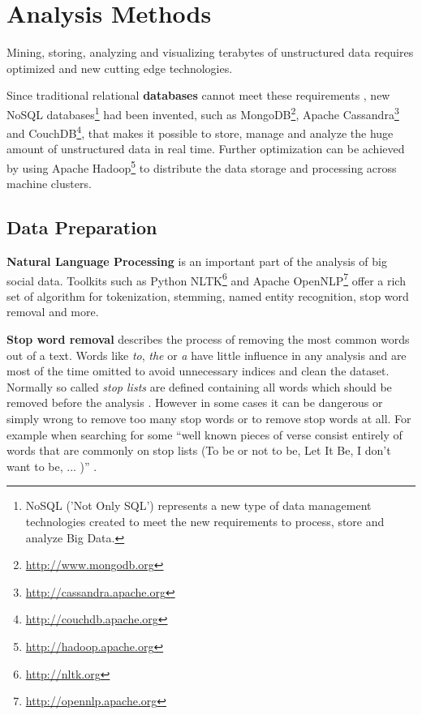\section{Analysis Methods}
\label{sec:technologies}
Mining, storing, analyzing and visualizing terabytes of unstructured data requires optimized and new cutting edge technologies. 

Since traditional relational \textbf{databases} cannot meet these requirements \cite{TwitterDataAnalytics2013}, new NoSQL databases\footnote{NoSQL ('Not Only SQL') represents a new type of data management technologies created to meet the new requirements to process, store and analyze Big Data.} had been invented, such as MongoDB\footnote{\url{http://www.mongodb.org} \accessednote }, Apache Cassandra\footnote{\url{http://cassandra.apache.org} \accessednote} and CouchDB\footnote{\url{http://couchdb.apache.org} \accessednote}, that makes it possible to store, manage and analyze the huge amount of unstructured data in real time. Further optimization can be achieved by using Apache Hadoop\footnote{\url{http://hadoop.apache.org} \accessednote} to distribute the data storage and processing across machine clusters.


\subsection{Data Preparation}
\label{subsec:data-preparation}
\textbf{Natural Language Processing} is an important part of the analysis of big social data. Toolkits such as Python NLTK\footnote{\url{http://nltk.org} \accessednote} and Apache OpenNLP\footnote{\url{http://opennlp.apache.org} \accessednote} offer a rich set of algorithm for tokenization, stemming, named entity recognition, stop word removal and more.

\textbf{Stop word removal} describes the process of removing the most common words out of a text. Words like \textit{to}, \textit{the} or \textit{a} have little influence in any analysis and are most of the time omitted to avoid unnecessary indices and clean the dataset. Normally so called \textit{stop lists} are defined containing all words which should be removed before the analysis \cite[27]{manning2008introduction}. However in some cases it can be dangerous or simply wrong to remove too many stop words or to remove stop words at all. For example when searching for some \enquote{well known pieces of verse consist entirely of words that are commonly on stop lists (To be or not to be, Let It Be, I don’t want to be, ... )} \cite[27]{manning2008introduction}.

